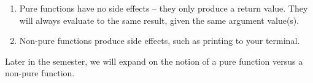 \begin{enumerate}
\item Pure functions have no side effects -- they only produce a return value.
    They will always evaluate to the same result, given the same argument
    value(s).
\item Non-pure functions produce side effects, such as printing to your
    terminal.
\end{enumerate}

Later in the semester, we will expand on the notion of a pure function
versus a non-pure function.

